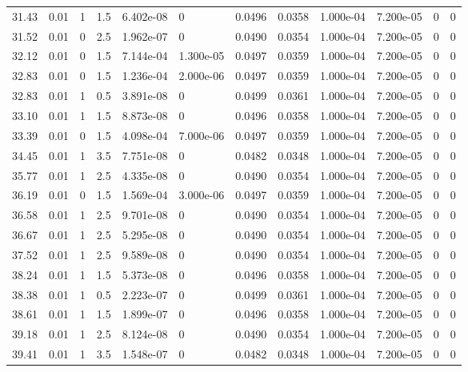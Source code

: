 \documentclass[preview]{standalone}
\begin{document}
{{{\begin{tabular}{L{1.2cm}C{1.2cm} C{0.3cm}C{0.5cm} C{1.4cm}C{1.4cm} C{1.4cm}C{1.4cm} C{1.6cm}C{1.6cm} C{1.6cm}C{1.6cm}}
  31.43  &  0.01  & 1     & 1.5 &  6.402e-08  & 0  &  0.0496&   0.0358& 1.000e-04 & 7.200e-05   &  0 & 0  \\ 
  31.52  &  0.01  & 0     & 2.5 &  1.962e-07  & 0  &  0.0490&   0.0354& 1.000e-04 & 7.200e-05   &  0 & 0  \\ 
  32.12  &  0.01  & 0     & 1.5 &  7.144e-04  & 1.300e-05  &  0.0497&   0.0359& 1.000e-04 & 7.200e-05   &  0 & 0  \\ 
  32.83  &  0.01  & 0     & 1.5 &  1.236e-04  & 2.000e-06  &  0.0497&   0.0359& 1.000e-04 & 7.200e-05   &  0 & 0  \\ 
  32.83  &  0.01  & 1     & 0.5 &  3.891e-08  & 0  &  0.0499&   0.0361& 1.000e-04 & 7.200e-05   &  0 & 0  \\ 
  33.10  &  0.01  & 1     & 1.5 &  8.873e-08  & 0  &  0.0496&   0.0358& 1.000e-04 & 7.200e-05   &  0 & 0  \\ 
  33.39  &  0.01  & 0     & 1.5 &  4.098e-04  & 7.000e-06  &  0.0497&   0.0359& 1.000e-04 & 7.200e-05   &  0 & 0  \\ 
  34.45  &  0.01  & 1     & 3.5 &  7.751e-08  & 0  &  0.0482&   0.0348& 1.000e-04 & 7.200e-05   &  0 & 0  \\ 
  35.77  &  0.01  & 1     & 2.5 &  4.335e-08  & 0  &  0.0490&   0.0354& 1.000e-04 & 7.200e-05   &  0 & 0  \\ 
  36.19  &  0.01  & 0     & 1.5 &  1.569e-04  & 3.000e-06  &  0.0497&   0.0359& 1.000e-04 & 7.200e-05   &  0 & 0  \\ 
  36.58  &  0.01  & 1     & 2.5 &  9.701e-08  & 0  &  0.0490&   0.0354& 1.000e-04 & 7.200e-05   &  0 & 0  \\ 
  36.67  &  0.01  & 1     & 2.5 &  5.295e-08  & 0  &  0.0490&   0.0354& 1.000e-04 & 7.200e-05   &  0 & 0  \\ 
  37.52  &  0.01  & 1     & 2.5 &  9.589e-08  & 0  &  0.0490&   0.0354& 1.000e-04 & 7.200e-05   &  0 & 0  \\ 
  38.24  &  0.01  & 1     & 1.5 &  5.373e-08  & 0  &  0.0496&   0.0358& 1.000e-04 & 7.200e-05   &  0 & 0  \\ 
  38.38  &  0.01  & 1     & 0.5 &  2.223e-07  & 0  &  0.0499&   0.0361& 1.000e-04 & 7.200e-05   &  0 & 0  \\ 
  38.61  &  0.01  & 1     & 1.5 &  1.899e-07  & 0  &  0.0496&   0.0358& 1.000e-04 & 7.200e-05   &  0 & 0  \\ 
  39.18  &  0.01  & 1     & 2.5 &  8.124e-08  & 0  &  0.0490&   0.0354& 1.000e-04 & 7.200e-05   &  0 & 0  \\ 
  39.41  &  0.01  & 1     & 3.5 &  1.548e-07  & 0  &  0.0482&   0.0348& 1.000e-04 & 7.200e-05   &  0 & 0  \\ 

\end{tabular}}}}
\end{document}
